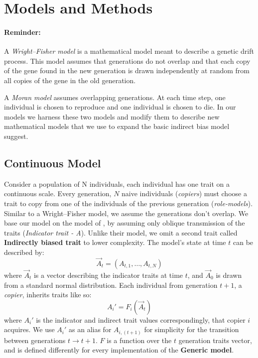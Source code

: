 \documentclass[11pt]{article}
\begin{document}
\section{Models and Methods}
\paragraph{Reminder:} A \textit{Wright–Fisher model} is a mathematical model meant to describe a genetic drift process. This model assumes that generations do not overlap and that each copy of the gene found in the new generation is drawn independently at random from all copies of the gene in the old generation.

A \textit{Moran model} assumes overlapping generations. At each time step, one individual is chosen to reproduce and one individual is chosen to die. In our models we harness these two models and modify them to describe new mathematical models that we use to expand the basic indirect bias model \citet{evolutionBook} suggest.

\subsection{Continuous Model}
Consider a population of N individuals, each individual has one trait on a continuous scale. Every generation, $N$ naive individuals (\textit{copiers}) must choose a trait to copy from one of the individuals of the previous generation (\textit{role-models}). Similar to a Wright–Fisher model, we assume the generations don’t overlap. We base our model on the model of \citet{evolutionBook}, by assuming only oblique transmission of the traits (\textit{Indicator trait - A}). Unlike their model, we omit a second trait called \textbf{Indirectly biased trait} to lower complexity. The model’s state at time $t$ can be described by:
\begin{equation}
\vec{A}_t=(A_{t,1}, \ldots, A_{t,N})
\end{equation}
where $\vec{A}_t$ is a vector describing the indicator traits at time $t$, and $\vec{A}_0$ is drawn from a standard normal distribution.
Each individual from generation $t+1$, a \textit{copier}, inherits traits like so:
\begin{equation}
A_i' = F_i(\vec{A}_t)
\end{equation}
where $A_i'$ is the indicator and indirect trait values correspondingly, that copier $i$ acquires.
We use $A_i'$ as an alias for $A_{i,(t+1)}$ for simplicity for the transition between generations $t \rightarrow t+1$.
$F$ is a function over the $t$ generation traits vector, and is defined differently for every implementation of the \textbf{Generic model}.
\end{document}

